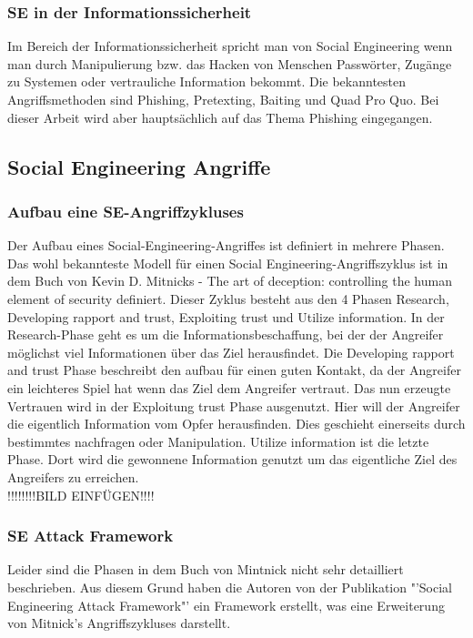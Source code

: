 \subsubsection{SE in der Informationssicherheit}
Im Bereich der Informationssicherheit spricht man von Social Engineering wenn man durch Manipulierung bzw. das Hacken von Menschen Passwörter, Zugänge zu Systemen oder vertrauliche Information bekommt. Die bekanntesten Angriffsmethoden sind Phishing, Pretexting, Baiting und Quad Pro Quo. Bei dieser Arbeit wird aber hauptsächlich auf das Thema Phishing eingegangen.

\subsection{Social Engineering Angriffe}

\subsubsection{Aufbau eine SE-Angriffzykluses}
Der Aufbau eines Social-Engineering-Angriffes ist definiert in mehrere Phasen. Das wohl bekannteste Modell für einen Social Engineering-Angriffszyklus ist in dem Buch von Kevin D. Mitnicks - The art of deception: controlling the human element of security \cite{ArtOfDeception} definiert. Dieser Zyklus besteht aus den 4 Phasen Research, Developing rapport and trust, Exploiting trust und Utilize information.
In der Research-Phase geht es um die Informationsbeschaffung, bei der der Angreifer möglichst viel Informationen über das Ziel herausfindet. Die Developing rapport and trust Phase beschreibt den aufbau für einen guten Kontakt, da der Angreifer ein leichteres Spiel hat wenn das Ziel dem Angreifer vertraut. Das nun erzeugte Vertrauen wird in der Exploitung trust Phase ausgenutzt. Hier will der Angreifer die eigentlich Information vom Opfer herausfinden. Dies geschieht einerseits durch bestimmtes nachfragen oder Manipulation. Utilize information ist die letzte Phase. Dort wird die gewonnene Information genutzt um das eigentliche Ziel des Angreifers zu erreichen.\\

!!!!!!!!BILD EINFÜGEN!!!!\\

\subsubsection{SE Attack Framework}
Leider sind die Phasen in dem Buch von Mintnick \cite{ArtOfDeception} nicht sehr detailliert beschrieben. Aus diesem Grund haben die Autoren von der Publikation "'Social Engineering Attack Framework"' \cite{AttackFramework} ein Framework erstellt, was eine Erweiterung von Mitnick's Angriffszykluses darstellt.\\

